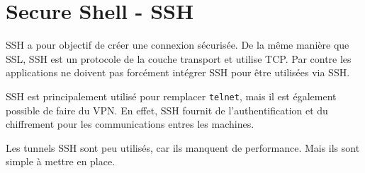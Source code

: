\section{Secure Shell - SSH}
SSH a pour objectif de créer une connexion sécurisée.
De la même manière que SSL, SSH est un protocole de la couche transport et utilise TCP.
Par contre les applications ne doivent pas forcément intégrer SSH pour être utilisées via SSH.

SSH est principalement utilisé pour remplacer \texttt{telnet}, mais il est également possible de faire du VPN.
En effet, SSH fournit de l'authentification et du chiffrement pour les communications entres les machines.

Les tunnels SSH sont peu utilisés, car ils manquent de performance.
Mais ils sont simple à mettre en place.